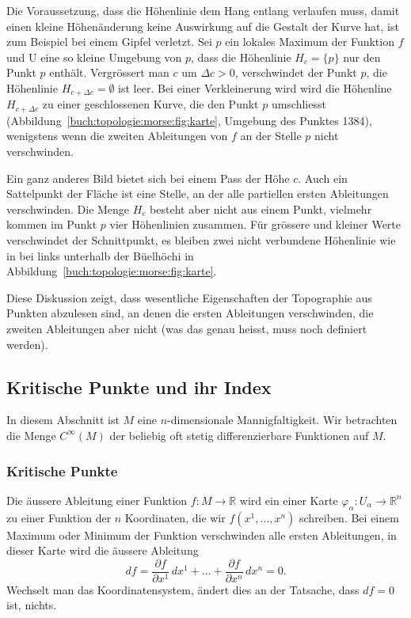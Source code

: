 Die Voraussetzung, dass die Höhenlinie dem Hang entlang verlaufen
muss, damit einen kleine Höhenänderung keine Auswirkung auf die
Gestalt der Kurve hat, ist zum Beispiel bei einem Gipfel verletzt.
Sei $p$ ein lokales Maximum der Funktion $f$ und U eine so kleine
Umgebung von $p$, dass die Höhenlinie $H_c = \{p\}$ nur den Punkt $p$
enthält.
Vergrössert man $c$ um $\Delta c>0$, verschwindet der Punkt $p$,
die Höhenlinie $H_{c+\Delta c}=\emptyset$ ist leer.
Bei einer Verkleinerung wird wird die Höhenline $H_{c+\Delta c}$ zu
einer geschlossenen Kurve, die den Punkt $p$ umschliesst
(Abbildung~\ref{buch:topologie:morse:fig:karte}, Umgebung des Punktes 1384),
wenigstens wenn die zweiten Ableitungen von $f$ an der Stelle $p$
nicht verschwinden.

Ein ganz anderes Bild bietet sich bei einem Pass der Höhe $c$.
Auch ein Sattelpunkt der Fläche ist eine Stelle, an der
alle partiellen ersten Ableitungen verschwinden.
Die Menge $H_c$ besteht aber nicht aus einem Punkt, vielmehr
kommen im Punkt $p$ vier Höhenlinien zusammen.
Für grössere und kleiner Werte verschwindet der Schnittpunkt,
es bleiben zwei nicht verbundene Höhenlinie wie in
bei links unterhalb der Büelhöchi in
Abbildung~\ref{buch:topologie:morse:fig:karte}.

Diese Diskussion zeigt, dass wesentliche Eigenschaften der Topographie
aus Punkten abzulesen sind, an denen die ersten Ableitungen verschwinden,
die zweiten Ableitungen aber nicht (was das genau heisst, muss noch
definiert werden).

%
%
\subsection{Kritische Punkte und ihr Index}
In diesem Abschnitt ist $M$ eine $n$-dimensionale Mannigfaltigkeit.
Wir betrachten die Menge $C^\infty(M)$ der beliebig oft stetig
differenzierbare Funktionen auf $M$.

%
%
\subsubsection{Kritische Punkte}
%
Die äussere Ableitung einer Funktion $f\colon M\to\mathbb{R}$ 
wird ein einer Karte $\varphi_\alpha\colon U_\alpha\to\mathbb{R}^n$
zu einer Funktion der $n$ Koordinaten, die wir $f(x^1,\dots,x^n)$
schreiben.
Bei einem Maximum oder Minimum der Funktion verschwinden alle ersten
Ableitungen, in dieser Karte wird die äussere Ableitung
\[
df
=
\frac{\partial f}{\partial x^1}\,dx^1
+
\dots
+
\frac{\partial f}{\partial x^n}\,dx^n
=
0.
\]
Wechselt man das Koordinatensystem, ändert dies an der Tatsache, dass
$df=0$ ist, nichts.

